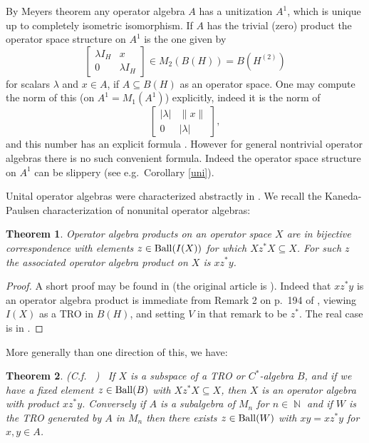 \documentclass{amsart}
\newtheorem{theorem}{Theorem}[section]
\theoremstyle{remark}
\theoremstyle{definition}
\numberwithin{equation}{section}
\DeclareMathOperator{\bN}{{\mathbb N}}
\begin{document}
               
        
        By Meyers theorem any operator algebra $A$ has a unitization $A^1$, which is unique up to 
        completely isometric isomorphism.  If $A$ has the trivial (zero) product the operator  space structure
        on $A^1$ is the one given by 
        $$\begin{bmatrix} \lambda I_H & x \\ 0 & \lambda I_H \end{bmatrix} \in M_2(B(H)) = B(H^{(2)})$$ for scalars $
       \lambda$ and $x \in A$, if $A \subseteq B(H)$ as an operator space.  One may compute the norm of this (on $A^1 = M_1(A^1)$) explicitly, indeed it is the norm of $$\begin{bmatrix} |\lambda | & \| x \| \\ 0 & | \lambda |\end{bmatrix},$$ 
       and this number has an explicit formula \cite[Lemma 2.3]{BNm2}. 
   However for general nontrivial   operator algebras there is no such convenient formula.    Indeed the 
   operator  space structure
        on $A^1$ can be slippery (see e.g.\ Corollary \ref{uni}).
   
   Unital operator algebras were characterized abstractly in \cite{BRS}.   We recall the Kaneda-Paulsen characterization of nonunital operator algebras:
        
        \begin{theorem} \label{KP} Operator algebra products on an operator space $X$ are in bijective correspondence 
        with elements $z \in {\rm Ball}(I(X))$ for which $X z^* X \subseteq X$.  For such $z$ the associated operator algebra product on $X$ is $x z^* y$. \end{theorem}
        
        \begin{proof} A short proof may be found in 
        \cite[Theorem 5.2]{BNm2} (the original article is \cite{KP}). 
        Indeed that $x z^* y$
        is an operator algebra product  is immediate from 
         Remark 2 on p.\ 194 of \cite{BRS}, viewing $I(X)$ as a TRO in $B(H)$, and setting $V$ in that remark to be $z^*$. The real case is in \cite[Section 3]{BReal}. \end{proof}
         
         
More generally than one direction of this, we have:

 \begin{theorem} \label{BRSKP}  ({\rm C.f.\ } \cite[Remark 2 on p.\ 194]{BRS}) \ If $X$ is a subspace of a TRO or $C^*$-algebra $B$, and if we have a fixed element 
$z \in {\rm Ball}(B)$ with $X z^* X \subseteq X$, then $X$ is an operator algebra with product $x z^* y$. 
Conversely if  $A$ is a subalgebra of $M_n$ for $n \in \bN$ and if $W$ is the TRO generated by $A$ in $M_n$ then 
there exists $z \in {\rm Ball}(W)$ with $xy = x z^* y$ for $x, y \in A$.  \end{theorem}
\end{document}
